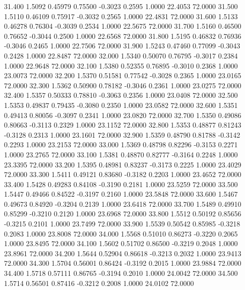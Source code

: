   31.400   1.5092   0.45979   0.75500  -0.3023   0.2595   1.0000  22.4053  72.0000
  31.500   1.5110   0.46109   0.75917  -0.3032   0.2565   1.0000  22.4831  72.0000
  31.600   1.5133   0.46278   0.76304  -0.3039   0.2534   1.0000  22.5675  72.0000
  31.700   1.5160   0.46500   0.76652  -0.3044   0.2500   1.0000  22.6568  72.0000
  31.800   1.5195   0.46832   0.76936  -0.3046   0.2465   1.0000  22.7506  72.0000
  31.900   1.5243   0.47460   0.77099  -0.3043   0.2428   1.0000  22.8487  72.0000
  32.000   1.5340   0.50070   0.76795  -0.3017   0.2384   1.0000  22.9648  72.0000
  32.100   1.5380   0.52355   0.76895  -0.3010   0.2368   1.0000  23.0073  72.0000
  32.200   1.5370   0.51581   0.77542  -0.3028   0.2365   1.0000  23.0165  72.0000
  32.300   1.5362   0.50900   0.78182  -0.3046   0.2361   1.0000  23.0275  72.0000
  32.400   1.5357   0.50333   0.78810  -0.3063   0.2356   1.0000  23.0408  72.0000
  32.500   1.5353   0.49837   0.79435  -0.3080   0.2350   1.0000  23.0582  72.0000
  32.600   1.5351   0.49413   0.80056  -0.3097   0.2341   1.0000  23.0820  72.0000
  32.700   1.5350   0.49086   0.80663  -0.3113   0.2329   1.0000  23.1152  72.0000
  32.800   1.5353   0.48877   0.81243  -0.3128   0.2313   1.0000  23.1601  72.0000
  32.900   1.5359   0.48790   0.81788  -0.3142   0.2293   1.0000  23.2153  72.0000
  33.000   1.5369   0.48798   0.82296  -0.3153   0.2271   1.0000  23.2765  72.0000
  33.100   1.5381   0.48870   0.82777  -0.3164   0.2248   1.0000  23.3395  72.0000
  33.200   1.5395   0.48981   0.83237  -0.3173   0.2225   1.0000  23.4029  72.0000
  33.300   1.5411   0.49121   0.83680  -0.3182   0.2203   1.0000  23.4652  72.0000
  33.400   1.5428   0.49283   0.84108  -0.3190   0.2181   1.0000  23.5259  72.0000
  33.500   1.5447   0.49466   0.84522  -0.3197   0.2160   1.0000  23.5848  72.0000
  33.600   1.5467   0.49673   0.84920  -0.3204   0.2139   1.0000  23.6418  72.0000
  33.700   1.5489   0.49910   0.85299  -0.3210   0.2120   1.0000  23.6968  72.0000
  33.800   1.5512   0.50192   0.85656  -0.3215   0.2101   1.0000  23.7499  72.0000
  33.900   1.5539   0.50542   0.85985  -0.3218   0.2083   1.0000  23.8008  72.0000
  34.000   1.5568   0.51010   0.86273  -0.3220   0.2065   1.0000  23.8495  72.0000
  34.100   1.5602   0.51702   0.86500  -0.3219   0.2048   1.0000  23.8961  72.0000
  34.200   1.5644   0.52904   0.86618  -0.3213   0.2032   1.0000  23.9413  72.0000
  34.300   1.5704   0.56001   0.86424  -0.3192   0.2015   1.0000  23.9884  72.0000
  34.400   1.5718   0.57111   0.86765  -0.3194   0.2010   1.0000  24.0042  72.0000
  34.500   1.5714   0.56501   0.87416  -0.3212   0.2008   1.0000  24.0102  72.0000
